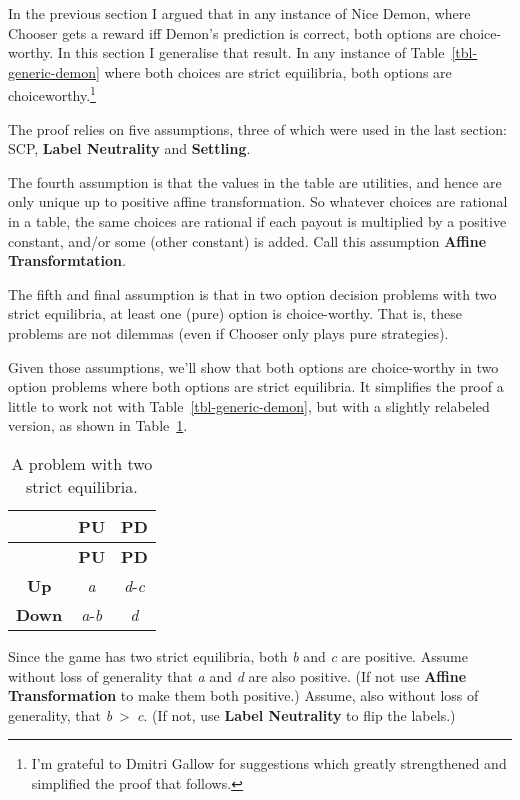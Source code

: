 \documentclass[
  10pt,
  letterpaper,
  DIV=11,
  numbers=noendperiod,
  twoside]{scrartcl}
\begin{document}
In the previous section I argued that in any instance of Nice Demon,
where Chooser gets a reward iff Demon's prediction is correct, both
options are choice-worthy. In this section I generalise that result. In
any instance of Table~\ref{tbl-generic-demon} where both choices are
strict equilibria, both options are choiceworthy.\footnote{I'm grateful
  to Dmitri Gallow for suggestions which greatly strengthened and
  simplified the proof that follows.}

The proof relies on five assumptions, three of which were used in the
last section: SCP, \textbf{Label Neutrality} and \textbf{Settling}.

The fourth assumption is that the values in the table are utilities, and
hence are only unique up to positive affine transformation. So whatever
choices are rational in a table, the same choices are rational if each
payout is multiplied by a positive constant, and/or some (other
constant) is added. Call this assumption \textbf{Affine
Transformtation}.

The fifth and final assumption is that in two option decision problems
with two strict equilibria, at least one (pure) option is choice-worthy.
That is, these problems are not dilemmas (even if Chooser only plays
pure strategies).

Given those assumptions, we'll show that both options are choice-worthy
in two option problems where both options are strict equilibria. It
simplifies the proof a little to work not with
Table~\ref{tbl-generic-demon}, but with a slightly relabeled version, as
shown in Table~\ref{tbl-two-good}.

\begin{longtable}[]{@{}ccc@{}}
\caption{A problem with two strict
equilibria.}\label{tbl-two-good}\tabularnewline
\toprule\noalign{}
& \textbf{PU} & \textbf{PD} \\
\midrule\noalign{}
\endfirsthead
\toprule\noalign{}
& \textbf{PU} & \textbf{PD} \\
\midrule\noalign{}
\endhead
\bottomrule\noalign{}
\endlastfoot
\textbf{Up} & \emph{a} & \emph{d}-\emph{c} \\
\textbf{Down} & \emph{a}-\emph{b} & \emph{d} \\
\end{longtable}

Since the game has two strict equilibria, both \emph{b} and \emph{c} are
positive. Assume without loss of generality that \emph{a} and \emph{d}
are also positive. (If not use \textbf{Affine Transformation} to make
them both positive.) Assume, also without loss of generality, that
\emph{b}~\textgreater~\emph{c}. (If not, use \textbf{Label Neutrality}
to flip the labels.)
\end{document}
